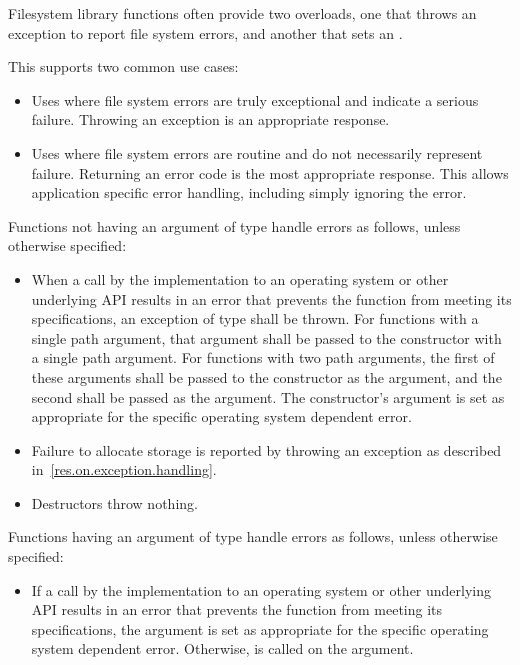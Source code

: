 \pnum
Filesystem library functions often provide two overloads, one that
throws an exception to report file system errors, and another that sets an .
\begin{note}
This supports two common use cases:
\begin{itemize}
\item
Uses where file system errors are truly exceptional
and indicate a serious failure.
Throwing an exception is an appropriate response.
\item
Uses where file system errors are routine
and do not necessarily represent failure.
Returning an error code is the most appropriate response.
This allows application specific error handling, including simply ignoring the error.
\end{itemize}
\end{note}

\pnum
Functions not having an argument of type 
handle errors as follows, unless otherwise specified:
\begin{itemize}
\item When a call by the
  implementation to an operating system or other underlying API results in an
  error that prevents the function from meeting its specifications, an exception
  of type
 shall be thrown. For functions with a single path
  argument, that argument shall be passed to the
 constructor with a single path argument. For
  functions with two path arguments, the first of these arguments shall be
  passed to the
 constructor as the  argument,
  and the second shall be passed as the  argument. The
   constructor's  argument
  is set as appropriate for the specific operating system dependent error.
\item Failure to allocate storage is reported by throwing an exception
as described in~\ref{res.on.exception.handling}.
\item Destructors throw nothing.
\end{itemize}

\pnum
Functions having an argument of type 
handle errors as follows, unless otherwise specified:
\begin{itemize}
\item If a call by the
  implementation to an operating system or other underlying API results in an
  error that prevents the function from meeting its specifications, the
   argument is set as
  appropriate for the specific operating system dependent error. Otherwise, 
  is called on the
   argument.
\end{itemize}

